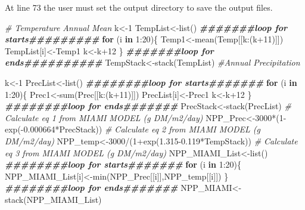 \documentclass[
  10pt,
  b5paper,
]{book}
\newenvironment{Shaded}{\begin{snugshade}}{\end{snugshade}}
\newcommand{\CommentTok}[1]{\textcolor[rgb]{0.56,0.35,0.01}{\textit{#1}}}
\newcommand{\ControlFlowTok}[1]{\textcolor[rgb]{0.13,0.29,0.53}{\textbf{#1}}}
\newcommand{\DecValTok}[1]{\textcolor[rgb]{0.00,0.00,0.81}{#1}}
\newcommand{\DocumentationTok}[1]{\textcolor[rgb]{0.56,0.35,0.01}{\textbf{\textit{#1}}}}
\newcommand{\FloatTok}[1]{\textcolor[rgb]{0.00,0.00,0.81}{#1}}
\newcommand{\FunctionTok}[1]{\textcolor[rgb]{0.00,0.00,0.00}{#1}}
\newcommand{\NormalTok}[1]{#1}
\newcommand{\OtherTok}[1]{\textcolor[rgb]{0.56,0.35,0.01}{#1}}
\newcommand{\SpecialCharTok}[1]{\textcolor[rgb]{0.00,0.00,0.00}{#1}}
\begin{document}
At line 73 the user must set the output directory to save the output files.

\begin{Shaded}
\begin{Highlighting}[]
\CommentTok{\# Temperature Annual Mean }
\NormalTok{k}\OtherTok{\textless{}{-}}\DecValTok{1}
\NormalTok{TempList}\OtherTok{\textless{}{-}}\FunctionTok{list}\NormalTok{()}
\DocumentationTok{\#\#\#\#\#\#\#loop for starts\#\#\#\#\#\#\#\#\#}
\ControlFlowTok{for}\NormalTok{ (i }\ControlFlowTok{in} \DecValTok{1}\SpecialCharTok{:}\DecValTok{20}\NormalTok{)\{}
\NormalTok{Temp1}\OtherTok{\textless{}{-}}\FunctionTok{mean}\NormalTok{(Temp[[k}\SpecialCharTok{:}\NormalTok{(k}\SpecialCharTok{+}\DecValTok{11}\NormalTok{)]])}
\NormalTok{TempList[i]}\OtherTok{\textless{}{-}}\NormalTok{Temp1}
\NormalTok{k}\OtherTok{\textless{}{-}}\NormalTok{k}\SpecialCharTok{+}\DecValTok{12}
\NormalTok{\}}
\DocumentationTok{\#\#\#\#\#\#\#loop for ends\#\#\#\#\#\#\#\#\#\#}
\NormalTok{TempStack}\OtherTok{\textless{}{-}}\FunctionTok{stack}\NormalTok{(TempList)}
\CommentTok{\#Annual Precipitation}

\NormalTok{k}\OtherTok{\textless{}{-}}\DecValTok{1}
\NormalTok{PrecList}\OtherTok{\textless{}{-}}\FunctionTok{list}\NormalTok{()}
\DocumentationTok{\#\#\#\#\#\#\#\#loop for starts\#\#\#\#\#\#\#}
\ControlFlowTok{for}\NormalTok{ (i }\ControlFlowTok{in} \DecValTok{1}\SpecialCharTok{:}\DecValTok{20}\NormalTok{)\{}
\NormalTok{Prec1}\OtherTok{\textless{}{-}}\FunctionTok{sum}\NormalTok{(Prec[[k}\SpecialCharTok{:}\NormalTok{(k}\SpecialCharTok{+}\DecValTok{11}\NormalTok{)]])}
\NormalTok{PrecList[i]}\OtherTok{\textless{}{-}}\NormalTok{Prec1}
\NormalTok{k}\OtherTok{\textless{}{-}}\NormalTok{k}\SpecialCharTok{+}\DecValTok{12}
\NormalTok{\}}
\DocumentationTok{\#\#\#\#\#\#\#\#loop for ends\#\#\#\#\#\#\#}
\NormalTok{PrecStack}\OtherTok{\textless{}{-}}\FunctionTok{stack}\NormalTok{(PrecList)}
\CommentTok{\# Calculate eq 1 from MIAMI MODEL (g DM/m2/day)}
\NormalTok{NPP\_Prec}\OtherTok{\textless{}{-}}\DecValTok{3000}\SpecialCharTok{*}\NormalTok{(}\DecValTok{1}\SpecialCharTok{{-}}\FunctionTok{exp}\NormalTok{(}\SpecialCharTok{{-}}\FloatTok{0.000664}\SpecialCharTok{*}\NormalTok{PrecStack))}
\CommentTok{\# Calculate eq 2 from MIAMI MODEL (g DM/m2/day)}
\NormalTok{NPP\_temp}\OtherTok{\textless{}{-}}\DecValTok{3000}\SpecialCharTok{/}\NormalTok{(}\DecValTok{1}\SpecialCharTok{+}\FunctionTok{exp}\NormalTok{(}\FloatTok{1.315{-}0.119}\SpecialCharTok{*}\NormalTok{TempStack))}
\CommentTok{\# Calculate eq 3 from MIAMI MODEL (g DM/m2/day)}
\NormalTok{NPP\_MIAMI\_List}\OtherTok{\textless{}{-}}\FunctionTok{list}\NormalTok{()}
\DocumentationTok{\#\#\#\#\#\#\#\#loop for starts\#\#\#\#\#\#\#}
\ControlFlowTok{for}\NormalTok{ (i }\ControlFlowTok{in} \DecValTok{1}\SpecialCharTok{:}\DecValTok{20}\NormalTok{)\{}
\NormalTok{NPP\_MIAMI\_List[i]}\OtherTok{\textless{}{-}}\FunctionTok{min}\NormalTok{(NPP\_Prec[[i]],NPP\_temp[[i]])}
\NormalTok{\}}
\DocumentationTok{\#\#\#\#\#\#\#\#loop for ends\#\#\#\#\#\#\#}
\NormalTok{NPP\_MIAMI}\OtherTok{\textless{}{-}}\FunctionTok{stack}\NormalTok{(NPP\_MIAMI\_List)}


\end{Highlighting}
\end{Shaded}
\end{document}

